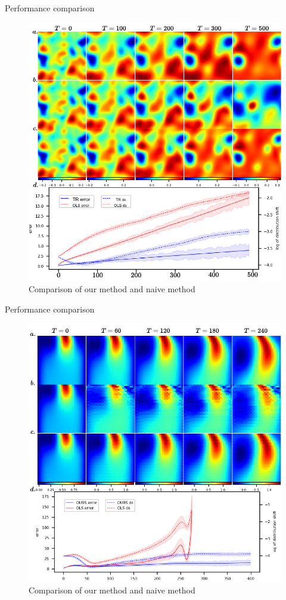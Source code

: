 \documentclass[paper slide]{beamer}
\begin{document}
\begin{frame}{Performance comparison}
	\begin{figure}[H]
          \centering
          \centerline{\includegraphics[width=.7\linewidth]{fig/RD-TR.pdf}}
          \caption{Comparison of our method and naive method}
\end{figure}
\end{frame}

\begin{frame}{Performance comparison}
	\begin{figure}[H]
          \centering
          \centerline{\includegraphics[width=.7\linewidth]{fig/NS-TR.pdf}}
          \caption{Comparison of our method and naive method}
\end{figure}
\end{frame}
\end{document}
